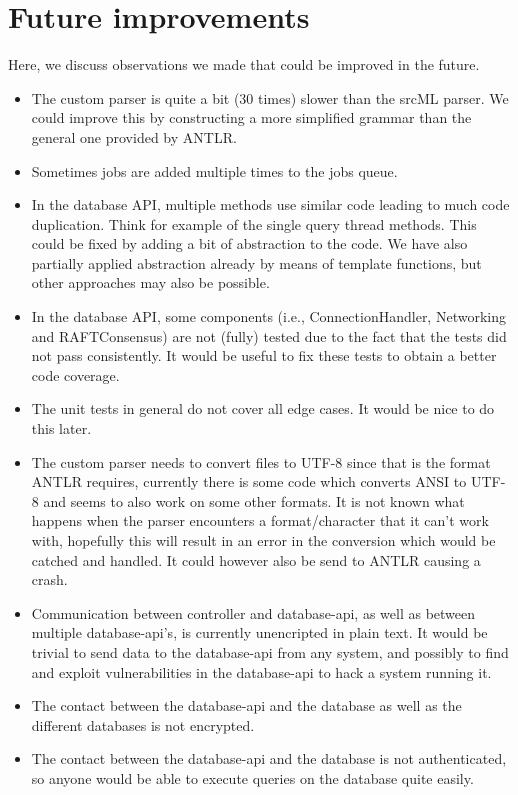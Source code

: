 \documentclass[./Main.tex]{subfiles}
\begin{document}
\section{Future improvements}
Here, we discuss observations we made that could be improved in the future.

\begin{itemize}
    \item The custom parser is quite a bit (30 times) slower than the srcML parser. We could improve this by constructing a more simplified grammar than the general one provided by ANTLR.
    \item Sometimes jobs are added multiple times to the jobs queue.
    \item In the database API, multiple methods use similar code leading to much code duplication. Think for example of the single query thread methods. This could be fixed by adding a bit of abstraction to the code. We have also partially applied abstraction already by means of template functions, but other approaches may also be possible.
    \item In the database API, some components (i.e., ConnectionHandler, Networking and RAFTConsensus) are not (fully) tested due to the fact that the tests did not pass consistently. It would be useful to fix these tests to obtain a better code coverage.
    \item The unit tests in general do not cover all edge cases. It would be nice to do this later.
    \item The custom parser needs to convert files to UTF-8 since that is the format ANTLR requires, currently there is some code which converts ANSI to UTF-8 and seems to also work on some other formats. It is not known what happens when the parser encounters a format/character that it can't work with, hopefully this will result in an error in the conversion which would be catched and handled. It could however also be send to ANTLR causing a crash.
    \item Communication between controller and database-api, as well as between multiple database-api's, is currently unencripted in plain text. It would be trivial to send data to the database-api from any system, and possibly to find and exploit vulnerabilities in the database-api to hack a system running it.
    \item The contact between the database-api and the database as well as the different databases is not encrypted.
    \item The contact between the database-api and the database is not authenticated, so anyone would be able to execute queries on the database quite easily.

\end{itemize}
\end{document}
